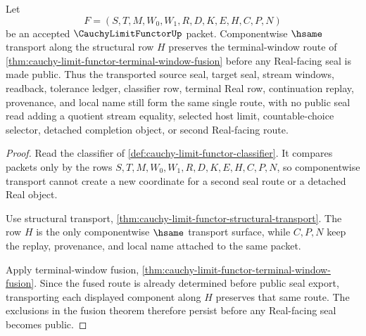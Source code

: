 \begin{theorem}
\label{thm:cauchy-limit-functor-real-seal-naturality}
Let
$$
F=(S,T,M,W_0,W_1,R,D,K,E,H,C,P,N)
$$
be an accepted $\CauchyLimitFunctorUp$ packet. Componentwise $\hsame$ transport along the structural row $H$ preserves the terminal-window route of \autoref{thm:cauchy-limit-functor-terminal-window-fusion} before any Real-facing seal is made public. Thus the transported source seal, target seal, stream windows, readback, tolerance ledger, classifier row, terminal Real row, continuation replay, provenance, and local name still form the same single route, with no public seal read adding a quotient stream equality, selected host limit, countable-choice selector, detached completion object, or second Real-facing route.
\end{theorem}
\begin{proof}
Read the classifier of \autoref{def:cauchy-limit-functor-classifier}. It compares packets only by the rows $S,T,M,W_0,W_1,R,D,K,E,H,C,P,N$, so componentwise transport cannot create a new coordinate for a second seal route or a detached Real object.

Use structural transport, \autoref{thm:cauchy-limit-functor-structural-transport}. The row $H$ is the only componentwise $\hsame$ transport surface, while $C,P,N$ keep the replay, provenance, and local name attached to the same packet.

Apply terminal-window fusion, \autoref{thm:cauchy-limit-functor-terminal-window-fusion}. Since the fused route is already determined before public seal export, transporting each displayed component along $H$ preserves that same route. The exclusions in the fusion theorem therefore persist before any Real-facing seal becomes public.
\end{proof}

